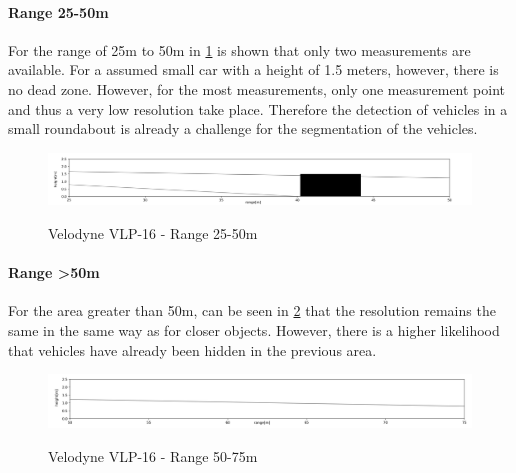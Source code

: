 \documentclass[11pt,oneside,openright]{mpreport}
\begin{document}
\paragraph{Range 25-50m}

For the range of 25m to 50m in \cref{velodyne_range_50} is shown that only two measurements are available. For a assumed small car with a height of 1.5 meters,
however, there is no dead zone. However, for the most measurements, only one measurement point and thus a very low resolution take place.
Therefore the detection of vehicles in a small roundabout is already a challenge for the segmentation of the vehicles.

\begin{figure}[!ht]
\caption{Velodyne VLP-16 - Range 25-50m}
\includegraphics[width=\textwidth]{bilder/range_50.png}
\label{velodyne_range_50}
\end{figure}

\paragraph{Range >50m}

For the area greater than 50m, can be seen in \cref{velodyne_range_75} that the resolution remains the same in the same way as for closer objects.
However, there is a higher likelihood that vehicles have already been hidden in the previous area.

\begin{figure}[!ht]
\caption{Velodyne VLP-16 - Range 50-75m}
\includegraphics[width=\textwidth]{bilder/range_75.png}
\label{velodyne_range_75}
\end{figure}
\end{document}
